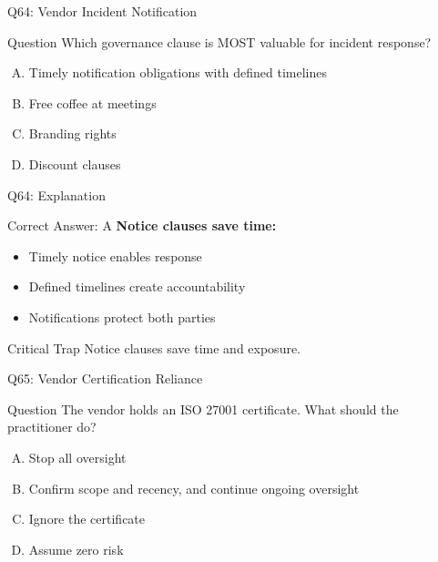 \documentclass{beamer}
\begin{document}
	\begin{frame}{Q64: Vendor Incident Notification}
		\begin{block}{Question}
			Which governance clause is MOST valuable for incident response?
		\end{block}
		\begin{enumerate}[(A)]
			\item Timely notification obligations with defined timelines
			\item Free coffee at meetings
			\item Branding rights
			\item Discount clauses
		\end{enumerate}
	\end{frame}
	
	\begin{frame}{Q64: Explanation}
		\begin{block}{Correct Answer: A}
			\textbf{Notice clauses save time:}
			\begin{itemize}
				\item Timely notice enables response
				\item Defined timelines create accountability
				\item Notifications protect both parties
			\end{itemize}
		\end{block}
		\begin{alertblock}{Critical Trap}
			Notice clauses save time and exposure.
		\end{alertblock}
	\end{frame}
	
	\begin{frame}{Q65: Vendor Certification Reliance}
		\begin{block}{Question}
			The vendor holds an ISO 27001 certificate. What should the practitioner do?
		\end{block}
		\begin{enumerate}[(A)]
			\item Stop all oversight
			\item Confirm scope and recency, and continue ongoing oversight
			\item Ignore the certificate
			\item Assume zero risk
		\end{enumerate}
	\end{frame}
	
\end{document}
